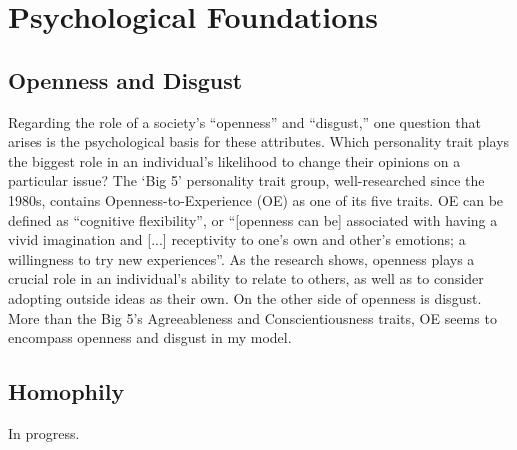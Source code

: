 \section{Psychological Foundations}

\subsection{Openness and Disgust}
Regarding the role of a society's ``openness'' and ``disgust,'' one question that arises is the
psychological basis for these attributes. Which personality trait plays the
biggest role in an individual's likelihood to change their opinions on a
particular issue? The `Big 5' personality trait group\cite{john_big-five_1999},
well-researched since the 1980s, contains Openness-to-Experience (OE) as one of
its five traits. OE can be defined as ``cognitive
flexibility''\cite{deyoung_sources_2005}, or ``[openness can be] associated
with having a vivid imagination and [...] receptivity to one's own and other's
emotions; a willingness to try new experiences''\cite{furnham_childhood_2016}.
As the research shows, openness plays a crucial role in an individual's ability
to relate to others, as well as to consider adopting outside ideas as their
own. On the other side of openness is disgust. More than the Big 5's Agreeableness and Conscientiousness traits, OE seems
to encompass openness and disgust in my model.

\subsection{Homophily}
In progress.